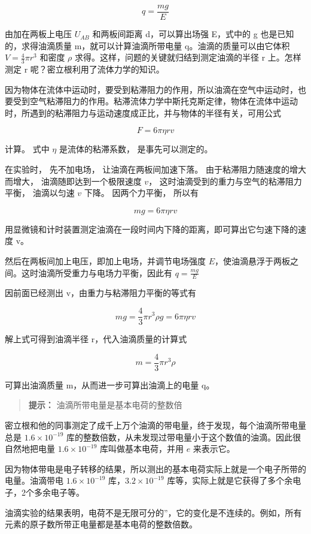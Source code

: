 \[
q = \frac{mg}{E} \tag{1.21}
\]

由加在两板上电压 \(U_{AB}\) 和两板间距离 d，可以算出场强 E，式中的 g
也是已知的，求得油滴质量 m，就可以计算油滴所带电量
q。油滴的质量可以由它体积 \(V = \frac{4}{3} \pi r^{3}\) 和密度 \(\rho\)
求得。这样，问题的关键就归结到测定油滴的半径 r 上。怎样测定 r
呢？密立根利用了流体力学的知识。

因为物体在流体中运动时，要受到粘滞阻力的作用，所以油滴在空气中运动时，也要受到空气粘滞阻力的作用。粘滞流体力学中斯托克斯定律，物体在流体中运动时，所遇到的粘滞阻力与运动速度成正比，并与物体的半径有关，可用公式

\[
F = 6 \pi \eta r v \tag{1.22}
\]

计算。 式中 \(\eta\) 是流体的粘滞系数， 是事先可以测定的。

在实验时， 先不加电场， 让油滴在两板间加速下落。
由于粘滞阻力随速度的增大而增大， 油滴随即达到一个极限速度 \(v\)，
这时油滴受到的重力与空气的粘滞阻力平衡， 油滴以匀速 \(v\) 下降。
因两个力平衡， 所以有

\[
mg = 6\pi\eta rv
\]

用显微镜和计时装置测定油滴在一段时间内下降的距离，即可算出它匀速下降的速度
v。

然后在两板间加上电压，即加上电场，并调节电场强度
\(E\)，使油滴悬浮于两板之间。这时油滴所受重力与电场力平衡，因此有
\(q=\frac{mg}{E}\)

因前面已经测出 v，由重力与粘滞阻力平衡的等式有

\[
m g = \frac{4}{3} \pi r^{3} \rho g = 6 \pi \eta r v
\]

解上式可得到油滴半径 r，代入油滴质量的计算式

\[
m = \frac{4}{3} \pi r^{3} \rho
\]

可算出油滴质量 m，从而进一步可算出油滴上的电量 q。

\begin{quote}
\textbf{提示：} 油滴所带电量是基本电荷的整数倍
\end{quote}

密立根和他的同事测定了成千上万个油滴的带电量，终于发现，每个油滴所带电量总是
\(1.6 \times 10^{-19}\)
库的整数倍数，从未发现过带电量小于这个数值的油滴。因此很自然地把电量
\(1.6 \times 10^{-19}\) 库叫做基本电荷，并用 \(e\) 来表示它。

因为物体带电是电子转移的结果，所以测出的基本电荷实际上就是一个电子所带的电量。油滴带电
\(1.6 \times 10^{-19}\) 库，\(3.2 \times 10^{-19}\)
库等，实际上就是它获得了多个余电子，2个多余电子等。

油滴实验的结果表明，电荷不是无限可分的''，它的变化是不连续的。例如，所有元素的原子数所带正电量都是基本电荷的整数倍数。

